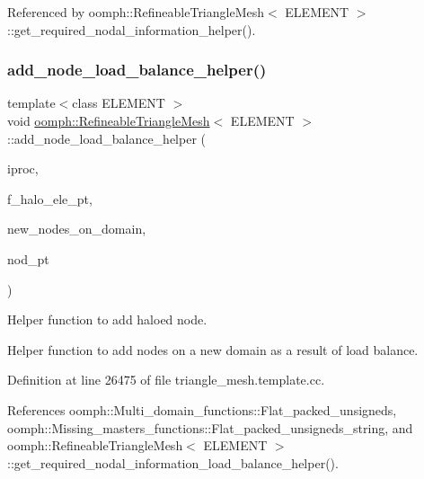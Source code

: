 Referenced by oomph\+::\+Refineable\+Triangle\+Mesh$<$ E\+L\+E\+M\+E\+N\+T $>$\+::get\+\_\+required\+\_\+nodal\+\_\+information\+\_\+helper().

\mbox{\label{classoomph_1_1RefineableTriangleMesh_a153def40c53393fdec956c17b6368bda}} 
\subsubsection{\texorpdfstring{add\+\_\+node\+\_\+load\+\_\+balance\+\_\+helper()}{add\_node\_load\_balance\_helper()}}
{\footnotesize\ttfamily template$<$class E\+L\+E\+M\+E\+NT $>$ \\
void \hyperlink{classoomph_1_1RefineableTriangleMesh}{oomph\+::\+Refineable\+Triangle\+Mesh}$<$ E\+L\+E\+M\+E\+NT $>$\+::add\+\_\+node\+\_\+load\+\_\+balance\+\_\+helper (\begin{DoxyParamCaption}\item[{unsigned \&}]{iproc,  }\item[{\hyperlink{classoomph_1_1Vector}{Vector}$<$ \hyperlink{classoomph_1_1Vector}{Vector}$<$ \hyperlink{classoomph_1_1FiniteElement}{Finite\+Element} $\ast$$>$ $>$ \&}]{f\+\_\+halo\+\_\+ele\+\_\+pt,  }\item[{\hyperlink{classoomph_1_1Vector}{Vector}$<$ \hyperlink{classoomph_1_1Node}{Node} $\ast$$>$ \&}]{new\+\_\+nodes\+\_\+on\+\_\+domain,  }\item[{\hyperlink{classoomph_1_1Node}{Node} $\ast$}]{nod\+\_\+pt }\end{DoxyParamCaption})\hspace{0.3cm}{\ttfamily [protected]}}



Helper function to add haloed node. 

Helper function to add nodes on a new domain as a result of load balance. 

Definition at line 26475 of file triangle\+\_\+mesh.\+template.\+cc.



References oomph\+::\+Multi\+\_\+domain\+\_\+functions\+::\+Flat\+\_\+packed\+\_\+unsigneds, oomph\+::\+Missing\+\_\+masters\+\_\+functions\+::\+Flat\+\_\+packed\+\_\+unsigneds\+\_\+string, and oomph\+::\+Refineable\+Triangle\+Mesh$<$ E\+L\+E\+M\+E\+N\+T $>$\+::get\+\_\+required\+\_\+nodal\+\_\+information\+\_\+load\+\_\+balance\+\_\+helper().



